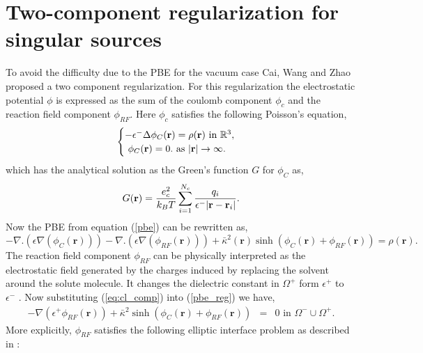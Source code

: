 \section{Two-component regularization for singular sources}
\label{2_comp_reg}
To avoid the difficulty due to the PBE for the vacuum case Cai, Wang and Zhao \cite{Cai2009} proposed a two component regularization. For this regularization the electrostatic potential $\phi$ is expressed as the sum of the coulomb component $\phi_c$ and the reaction field component $\phi_{RF}$.
Here $\phi_c$ satisfies the following Poisson's equation, 
\begin{equation}
	\begin{cases}
		-\epsilon^- \Delta\phi_C({\bf r}) = \rho({\bf r}) \text{   in   }\mathbb{R}^3 \label{rho_eq}, \\
		\text{      }\phi_C({\bf r})= 0. \text{   as  } |{\bf r}| \rightarrow \infty.
	\end{cases}
\end{equation}\label{eq:cl_comp}
which has the analytical solution as the Green's function $G$ for $\phi_C$ as,
\begin{equation}
	G({\bf r}) = \frac{e_c^2}{k_B T } \sum_{i=1}^{N_c} \frac{q_i }{\epsilon^{-}|{\bf r}-{\bf r}_i|}. \label{eq:green} %
\end{equation}
Now the PBE from equation (\ref{pbe}) can be rewritten as,
\begin{equation}
		-\nabla.(\epsilon\nabla (\phi_C(\textbf{r})))-\nabla.(\epsilon\nabla (\phi_{RF}(\textbf{r})))+\bar\kappa^2(\textbf{r}) \sinh (\phi_C(\textbf{r})+\phi_{RF}(\textbf{r}))=\rho(\textbf{r}). \label{pbe_reg} %
\end{equation}
The reaction field component $\phi_{RF}$ can be physically interpreted as the electrostatic field generated by the charges induced by replacing the solvent around the solute molecule. It changes the dielectric constant in $\Omega^+$ form $\epsilon^+$ to $\epsilon^-$ \cite{Cai2009}. Now substituting (\ref{eq:cl_comp}) into (\ref{pbe_reg}) we have,
\begin{eqnarray}
-\nabla(\epsilon^+ \phi_{RF}(\textbf{r})) +\bar\kappa^2 \sinh(\phi_C(\textbf{r})+\phi_{RF}(\textbf{r}))&=& 0 \text{ in } \Omega^- \cup \Omega^+.	
\end{eqnarray}
More explicitly, $\phi_{RF}$ satisfies the following elliptic interface problem as described in \cite{Chen2007}: 
